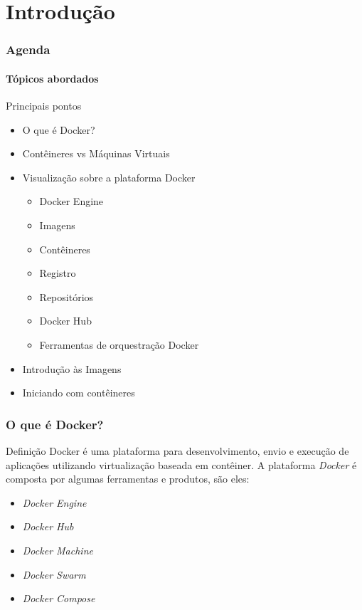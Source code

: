 \documentclass[12pt]{beamer}
\begin{document}
\section{Introdução}
\begin{frame}
  \frametitle{Agenda}
  \framesubtitle{Tópicos abordados}
  \begin{block}{Principais pontos}
		\begin{itemize}
			\item O que é Docker?
			\pause
			\item Contêineres vs Máquinas Virtuais
			\pause
			\item Visualização sobre a plataforma Docker
			\pause
				\begin{itemize}
					\item Docker Engine
					\pause
					\item Imagens
					\pause
					\item Contêineres
					\pause
					\item Registro
					\pause
					\item Repositórios
					\pause
					\item Docker Hub
					\pause
					\item Ferramentas de orquestração Docker
					\pause
				\end{itemize}
			\item Introdução às Imagens
			\pause
			\item Iniciando com contêineres
  			\end{itemize}
  \end{block}
\end{frame}
\begin{frame}
  \frametitle{O que é Docker?}
  \begin{block}{Definição}
					Docker é uma plataforma para desenvolvimento, envio e execução de
					aplicações utilizando virtualização baseada em contêiner.
					A plataforma \emph{Docker} é composta por algumas ferramentas e
					produtos, são eles:
  \begin{itemize}
		\item \emph{Docker Engine}
		\pause
		\item \emph{Docker Hub}
		\pause
		\item \emph{Docker Machine}
		\pause
		\item \emph{Docker Swarm}
		\pause
		\item \emph{Docker Compose}
  \end{itemize}
  \end{block}
\end{frame}
\end{document}
